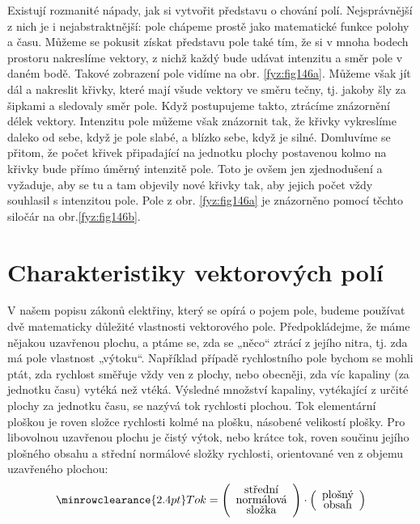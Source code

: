       Existují rozmanité nápady, jak si vytvořit představu o chování polí. Nejsprávnější z nich je i
      nejabstraktnější: pole chápeme prostě jako matematické funkce polohy a času. Můžeme se 
      pokusit získat představu pole také tím, že si v mnoha bodech prostoru nakreslíme vektory, z 
      nichž každý bude udávat intenzitu a směr pole v daném bodě. Takové zobrazení pole vidíme na 
      obr. \ref{fyz:fig146a}. Můžeme však jít dál a nakreslit křivky, které mají všude vektory 
      ve směru tečny, tj. jakoby šly za šipkami a sledovaly směr pole. Když postupujeme takto, 
      ztrácíme znázornění délek vektory. Intenzitu pole můžeme však znázornit tak, že křivky 
      vykreslíme daleko od sebe, když je pole slabé, a blízko sebe, když je silné. Domluvíme se 
      přitom, že počet křivek připadající na jednotku plochy postavenou kolmo na křivky 
      bude přímo úměrný intenzitě pole. Toto je ovšem jen zjednodušení a vyžaduje, aby se tu a tam 
      objevily nové křivky tak, aby jejich počet vždy souhlasil s intenzitou pole. Pole z obr. 
      \ref{fyz:fig146a} je znázorněno pomocí těchto siločár na obr.\ref{fyz:fig146b}.

        
  \section{Charakteristiky vektorových polí}
    V našem popisu zákonů elektřiny, který se opírá o pojem pole, budeme používat dvě matematicky 
    důležité vlastnosti vektorového pole. Předpokládejme, že máme nějakou uzavřenou plochu, a ptáme 
    se, zda se „něco“ ztrácí z jejího nitra, tj. zda má pole vlastnost „výtoku“. Například případě 
    rychlostního pole bychom se mohli ptát, zda rychlost směřuje vždy ven z plochy, nebo obecněji, 
    zda víc kapaliny (za jednotku času) vytéká než vtéká. Výsledné množství kapaliny, vytékající z 
    určité plochy za jednotku času, se nazývá tok rychlosti plochou. Tok elementární ploškou je 
    roven složce rychlosti kolmé na plošku, násobené velikostí plošky. Pro libovolnou uzavřenou 
    plochu je čistý výtok, nebo krátce tok, roven součinu jejího plošného obsahu a střední 
    normálové složky rychlosti, orientované ven z objemu uzavřeného plochou:    
    \begin{equation}\label{fyz:eq_fey_elmag04}
      \renewcommand\arraystretch{0.6} \setlength\minrowclearance{2.4pt}
      \text{Tok} = 
        \left(\begin{array}{c}
          \text{střední}      \\
          \text{normálová} \\
          \text{složka}
        \end{array}
      \right)\cdot
      \left(\begin{array}{c}
          \text{plošný}      \\
          \text{obsah}
        \end{array}
      \right)
    \end{equation}
    
